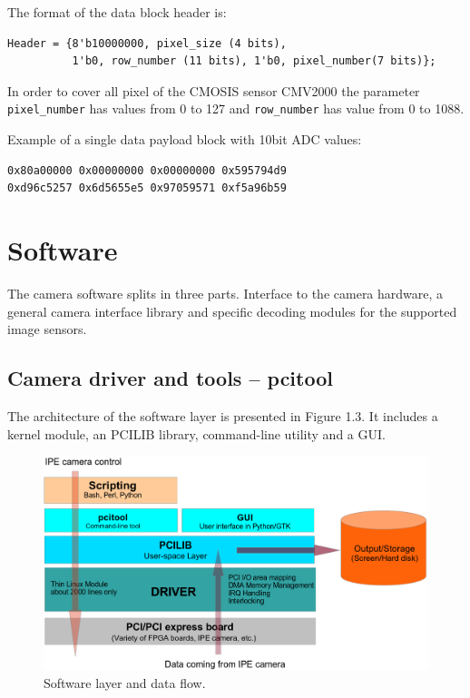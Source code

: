 The format of the data block header is:
\begin{verbatim}
Header = {8'b10000000, pixel_size (4 bits), 
          1'b0, row_number (11 bits), 1'b0, pixel_number(7 bits)};
\end{verbatim}

In order to cover all pixel of the CMOSIS sensor CMV2000 the parameter \verb/pixel_number/ has values from 0 to 127 and \verb/row_number/ has value from 0 to 1088.

Example of a single data payload block with 10bit ADC values:
\begin{verbatim}
0x80a00000 0x00000000 0x00000000 0x595794d9  
0xd96c5257 0x6d5655e5 0x97059571 0xf5a96b59
\end{verbatim}




\section{Software}

The camera software splits in three parts. Interface to the camera hardware, a general camera interface library and specific decoding modules for the supported image sensors.

\subsection{Camera driver and tools -- pcitool}

The architecture of the software layer is presented in Figure 1.3. It includes a kernel module, an PCILIB library, command-line utility and a GUI.

\begin{figure}
\includegraphics[width=\textwidth]{images/software_layer3.png}
\caption{\label{pcitool-arch} Software layer and data flow.}
\end{figure}

